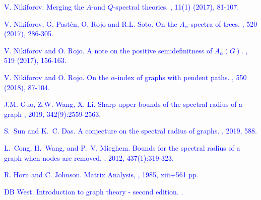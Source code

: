 \documentclass[amsthm]{elsart}
\begin{document}
\begin{thebibliography}{99}

\textcolor{blue}{
V. Nikiforov.
\newblock Merging the $A$-and $Q$-spectral theories.
, 11(1) (2017), 81-107.}

\textcolor{blue}{
V. Nikiforov, G. Past\'{e}n, O. Rojo and R.L. Soto.
\newblock On the $A_\alpha$-spectra of trees.
, 520 (2017), 286-305.}

\textcolor{blue}{
V. Nikiforov and O. Rojo.
\newblock A note on the positive semidefinitness of $A_\alpha(G)$.
, 519 (2017), 156-163.}

\textcolor{blue}{
V. Nikiforov and O. Rojo.
\newblock On the $\alpha$-index of graphs with pendent paths.
, 550 (2018), 87-104.}

\textcolor{blue}{
J.M. Guo, Z.W. Wang, X. Li.
\newblock Sharp upper bounds of the spectral radius of a graph
, 2019, 342(9):2559-2563.}

\textcolor{blue}{
S.~Sun and K.~C. Das.
\newblock A conjecture on the spectral radius of graphs.
, 2019, 588.}

\textcolor{blue}{
L.~Cong, H.~Wang, and P.~V. Mieghem.
\newblock Bounds for the spectral radius of a graph when nodes are removed.
, 2012, 437(1):319-323.}


\textcolor{blue}{
R. Horn and C. Johnson.
\newblock Matrix Analysis,
, 1985, xiii+561 pp.}

\textcolor{blue}{
DB West.
\newblock Introduction to graph theory - second edition.
.}










\end{thebibliography}
\end{document}
